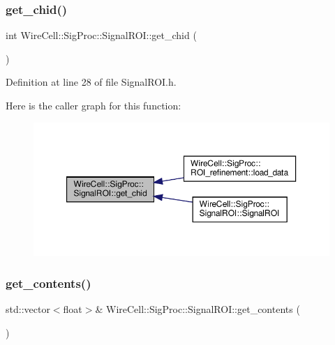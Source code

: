 \subsubsection{\texorpdfstring{get\+\_\+chid()}{get\_chid()}}
{\footnotesize\ttfamily int Wire\+Cell\+::\+Sig\+Proc\+::\+Signal\+R\+O\+I\+::get\+\_\+chid (\begin{DoxyParamCaption}{ }\end{DoxyParamCaption})\hspace{0.3cm}{\ttfamily [inline]}}



Definition at line 28 of file Signal\+R\+O\+I.\+h.

Here is the caller graph for this function\+:
\nopagebreak
\begin{figure}[H]
\begin{center}
\leavevmode
\includegraphics[width=350pt]{class_wire_cell_1_1_sig_proc_1_1_signal_r_o_i_a92565abca22adcc336111be6f487f9c9_icgraph}
\end{center}
\end{figure}
\mbox{\label{class_wire_cell_1_1_sig_proc_1_1_signal_r_o_i_aa2fee1613b1c49322cf5d738261cf1c9}} 
\subsubsection{\texorpdfstring{get\+\_\+contents()}{get\_contents()}}
{\footnotesize\ttfamily std\+::vector$<$float$>$\& Wire\+Cell\+::\+Sig\+Proc\+::\+Signal\+R\+O\+I\+::get\+\_\+contents (\begin{DoxyParamCaption}{ }\end{DoxyParamCaption})\hspace{0.3cm}{\ttfamily [inline]}}



